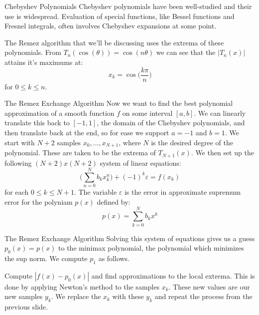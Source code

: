 \documentclass{beamer}
\begin{document}
    \begin{frame}{Chebyshev Polynomials}
        Chebyshev polynomials have been well-studied and their use is
        widespread. Evaluation of special functions, like Bessel functions and
        Fresnel integrals, often involves Chebyshev expansions at some point.
        \par\hfill\par
        The Remez algorithm that we'll be discussing uses the extrema of these
        polynomials. From $T_{n}(\cos(\theta))=\cos(n\theta)$ we can see that
        the $|T_{n}(x)|$ attains it's maximums at:
        \begin{equation}
            x_{k}=\cos\Big(\frac{k\pi}{n}\Big)
        \end{equation}
        for $0\leq{k}\leq{n}$.
    \end{frame}
    \begin{frame}{The Remez Exchange Algorithm}
        Now we want to find the best polynomial approximation of a smooth
        function $f$ on some interval $[a,b]$. We can linearly translate this
        back to $[-1,1]$, the domain of the Chebyshev polynomials, and then
        translate back at the end, so for ease we support $a=-1$ and $b=1$.
        We start with $N+2$ samples $x_{0},\dots,x_{N+1}$, where $N$ is the
        desired degree of the polynomial. These are taken to be the extrema of
        $T_{N+1}(x)$. We then set up the following $(N+2)x(N+2)$ system of
        linear equations:
        \begin{equation}
            \Big(\sum_{n=0}^{N}b_{k}x_{k}^{n}\Big)+(-1)^{k}\varepsilon=f(x_{k})
        \end{equation}
        for each $0\leq{k}\leq{N+1}$. The variable $\varepsilon$ is the error in
        approximate supremum error for the polyniam $p(x)$ defined by:
        \begin{equation}
            p(x)=\sum_{k=0}^{N}b_{k}x^{k}
        \end{equation}
    \end{frame}
    \begin{frame}{The Remez Exchange Algorithm}
        Solving this system of equations gives us a guess $p_{0}(x)=p(x)$ to
        the minimax polynomial, the polynomial which minimizes the sup norm.
        We compute $p_{1}$ as follows.
        \par\hfill\par
        Compute $|f(x)-p_{0}(x)|$ and find approximations to the local
        extrema. This is done by applying Newton's method to the samples
        $x_{k}$. These new values are our new samples $y_{k}$. We replace the
        $x_{k}$ with these $y_{k}$ and repeat the process from the previous
        slide.
    \end{frame}
\end{document}
